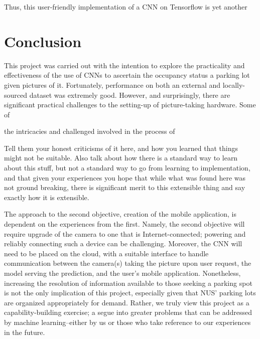 \documentclass[a4paper, 11pt]{article} %
\begin{document}
	Thus, this user-friendly implementation of a CNN on Tensorflow is yet 
	another 

\section{Conclusion}
	This project was carried out with the intention to explore the practicality 
	and effectiveness of the use of CNNs to ascertain the occupancy status a 
	parking lot given pictures of it. Fortunately, performance on both an 
	external and locally-sourced dataset was extremely good. However, and 
	surprisingly, there are significant practical challenges to the setting-up 
	of picture-taking hardware. Some of 
	
	the intricacies and challenged involved in the process of 



	Tell them your honest criticisms of it here, and how you learned that things
	might not be suitable.
	Also talk about how there is a standard way to learn about this stuff, but
	not a standard way to go from learning to implementation, and that given your
	experiences you hope that while what was found here was not ground breaking,
	there is significant merit to this extensible thing and say exactly how it is
	extensible.

	The approach to the second objective, creation of the mobile application, is
	dependent on the experiences from the first. Namely, the second objective will
	require upgrade of the camera to one that is Internet-connected; powering and
	reliably connecting such a device can be challenging.  Moreover, the CNN will
	need to be placed on the cloud, with a suitable interface to handle
	communication between the camera(s) taking the picture upon user request, the
	 model serving the prediction, and the user's mobile application.
	  Nonetheless, increasing the
	resolution of information available to those seeking a parking spot is not the
	only implication of this project, especially given that NUS' parking lots are
	organized appropriately for demand. Rather, we truly view this project as a
	capability-building exercise; a segue into greater problems that can be
	addressed by machine learning--either by us or those who take reference to our
	experiences in the future.
\end{document}
